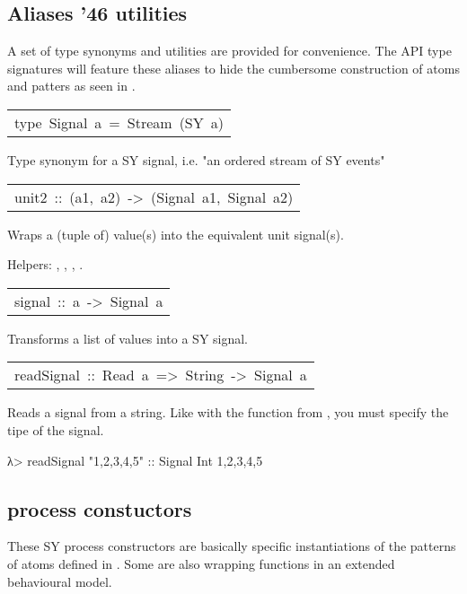 \subsection{Aliases {\char '46} utilities}
A set of type synonyms and utilities are provided for
 convenience. The API type signatures will feature these aliases
 to hide the cumbersome construction of atoms and patters as seen
 in .\par

\begin{haddockdesc}
\item[\begin{tabular}{@{}l}
type\ Signal\ a\ =\ Stream\ (SY\ a)
\end{tabular}]\haddockbegindoc
Type synonym for a SY signal, i.e. "an ordered stream of SY
 events"\par


\item[\begin{tabular}{@{}l}
unit2\ ::\ (a1,\ a2)\ ->\ (Signal\ a1,\ Signal\ a2)
\end{tabular}]\haddockbegindoc
Wraps a (tuple of) value(s) into the equivalent unit signal(s).\par
Helpers: , , , .\par


\item[\begin{tabular}{@{}l}
signal\ ::\ {\char 91}a{\char 93}\ ->\ Signal\ a
\end{tabular}]\haddockbegindoc
Transforms a list of values into a SY signal.\par


\item[\begin{tabular}{@{}l}
readSignal\ ::\ Read\ a\ =>\ String\ ->\ Signal\ a
\end{tabular}]\haddockbegindoc
Reads a signal from a string. Like with the  function from
 , you must specify the tipe of the signal.\par
\begin{interactive}
λ> readSignal "{1,2,3,4,5}" :: Signal Int
{1,2,3,4,5}

\end{interactive}
\end{haddockdesc}
\subsection{ process constuctors}
These SY process constructors are basically specific
 instantiations of the patterns of atoms defined in
 . Some are also wrapping functions in an
 extended behavioural model.\par

